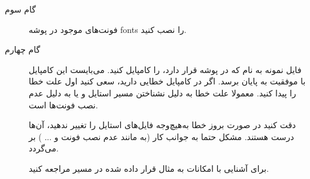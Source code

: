 \documentclass{report}
\begin{document}
\begin{description}
\item[گام سوم]
فونت‌های موجود در پوشه fonts را نصب کنید.

\item[گام چهارم]
فایل نمونه به نام
 که در پوشه 
قرار دارد، را کامپایل کنید. می‌بایست این کامپایل با موفقیت به پایان برسد. اگر در کامپایل خطایی دارید، سعی کنید اول علت خطا را پیدا کنید. معمولا علت خطا به دلیل نشناختن مسیر استایل و یا به دلیل عدم نصب فونت‌ها است. 
\begin{warning}
دقت کنید در صورت بروز خطا به‌هیچ‌وجه فایل‌های استایل را تغییر ندهید، آن‌ها درست هستند. مشکل حتما به جوانب کار (به مانند عدم نصب فونت و ... ) بر می‌گردد. 
\end{warning}
\begin{note}
برای آشنایی با امکانات 
 به مثال قرار داده شده در مسیر 
مراجعه کنید. 
\end{note}
\end{description}
\end{document}
